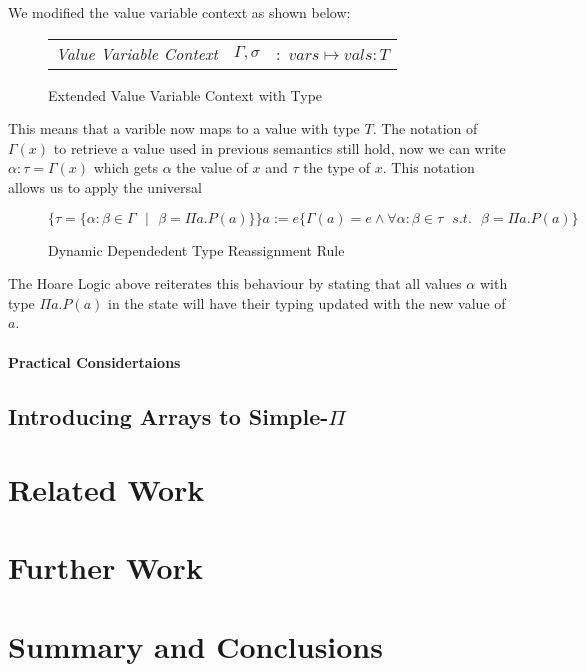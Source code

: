\documentclass[a4paper,12pt]{report}
\begin{document}
\par
We modified the value variable context as shown below:
 
\begin{figure}[H]
  \begin{center}
    \begin{tabular} {l l l}
      \textit{Value Variable Context} & $\Gamma, \sigma$& $:$ $vars \mapsto vals : T$ 
    \end{tabular}
  \end{center}
  \caption{Extended Value Variable Context with Type}
\end{figure}

This means that a varible now maps to a value with type $T$. The notation of 
$\Gamma(x)$ to retrieve a value used in previous semantics still hold, now we 
can write $\alpha : \tau = \Gamma(x)$ which gets $\alpha$ the value of $x$ 
and $\tau$ the type of $x$. This notation allows us to apply the universal 

\begin{figure}[H]
  \begin{center}
    \footnotesize$\{\tau = \{\alpha : \beta \in \Gamma\text{ }|\text{ }\beta = \Pi a. P(a)\}\}a := e\{\Gamma(a) = e \wedge 
    \forall \alpha : \beta \in \tau\text{ }s.t.\text{ }\beta = \Pi a. P(a)\}$ 
    \normalsize
  \end{center}
  \caption{Dynamic Dependedent Type Reassignment Rule}
\end{figure}


\par
The Hoare Logic above reiterates this behaviour by stating that all values $\alpha$ with 
type $\Pi a.P(a)$ in the state will have their typing updated with the new value 
of $a$.

\subsubsection{Practical Considertaions}



\section{Introducing Arrays to Simple-$\Pi$}






\chapter{Related Work}

\chapter{Further Work}

\chapter{Summary and Conclusions} 


\appendix
\singlespacing

\printbibliography
\end{document}

